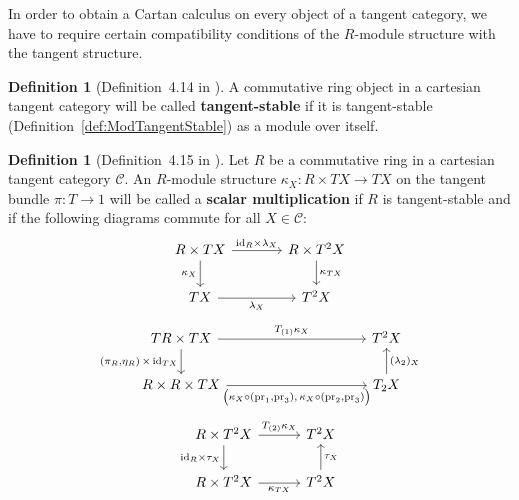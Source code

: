 \documentclass[12pt,reqno, a4paper]{amsart}
\numberwithin{equation}{section}
\theoremstyle{plain}
\theoremstyle{definition}
\newtheorem{Definition}[Theorem]{Definition}
\theoremstyle{remark}
\newcommand{\calC}{\mathcal{C}}
\newcommand{\id}{\mathrm{id}}
\newcommand{\Id}{\mathrm{1}}
\newcommand{\pr}{\mathrm{pr}}
\newcommand{\Val}{\eta}
\newcommand{\Tpart}[1]{T_{(#1)}}
\begin{document}
In order to obtain a Cartan calculus on every object of a tangent category, we have to require certain compatibility conditions of the $R$-module structure with the tangent structure.

\begin{Definition}[Definition~4.14 in \cite{AintablianBlohmann:2026}]
\label{def:TanStableRing}
A commutative ring object in a cartesian tangent category will be called \textbf{tangent-stable} if it is tangent-stable (Definition~\ref{def:ModTangentStable}) as a module over itself.
\end{Definition}

\begin{Definition}[Definition~4.15 in \cite{AintablianBlohmann:2026}]
\label{def:RScalar}
Let $R$ be a commutative ring in a cartesian tangent category $\calC$. An $R$-module structure $\kappa_X: R \times TX \to TX$ on the tangent bundle $\pi:T \to \Id$ will be called a \textbf{scalar multiplication} if $R$ is tangent-stable and if the following diagrams commute for all $X \in \calC$:
\begin{equation}
\label{diag:ScalarMult1}
\begin{tikzcd}[column sep={large}]
R \times TX
\ar[r, "\id_R \times \lambda_X"]
\ar[d, "\kappa_X"'] &
R \times T^2 X \ar[d, "\kappa_{TX}"]
\\
TX
\ar[r, "\lambda_X"']
&
T^2 X
\end{tikzcd}
\end{equation}
\begin{equation}
\label{diag:ScalarMult2}
\begin{tikzcd}[column sep=6em]
TR \times TX
\ar[r, "\Tpart{1}\kappa_X"]
\ar[d, "{(\pi_R, \Val_R) \, \times \, \id_{TX}}"']
&[4em]
T^2X
\\
R \times R \times TX
\ar[r, "{\big(\kappa_X \circ (\pr_1,\pr_3), \,
\kappa_X \circ (\pr_2,\pr_3)\big)}"']
&
T_2 X
\ar[u, "(\lambda_2)_X"']
\end{tikzcd}
\end{equation}
\begin{equation}
\label{diag:ScalarMult3}
\begin{tikzcd}[column sep=3em]
R \times T^2 X
\ar[r, "\Tpart{2}\kappa_X"]
\ar[d, "\id_R \times \tau_X"']
&
T^2 X
\\
R \times T^2 X
\ar[r, "\kappa_{TX}"']
&
T^2 X
\ar[u, "\tau_X"']
\end{tikzcd}
\end{equation}

\end{Definition}
\end{document}
